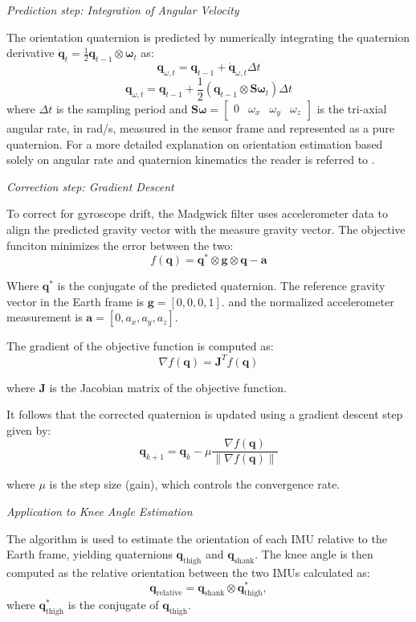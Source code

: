 \textit{Prediction step: Integration of Angular Velocity}

The orientation quaternion is predicted by numerically integrating the quaternion derivative 
\(
\dot{\mathbf{q}}_t = \frac{1}{2} \mathbf{q}_{t-1} \otimes \boldsymbol{\omega}_t
\) as:
\[
\mathbf{q}_{\omega, t} = \mathbf{q}_{t-1} + \dot{\mathbf{q}}_{\omega, t} \Delta t
\]
\[
\mathbf{q}_{\omega, t} = \mathbf{q}_{t-1} + \frac{1}{2} \left( \mathbf{q}_{t-1} \otimes \mathbf{S}\boldsymbol{\omega}_t \right) \Delta t
\]
where \( \Delta t \) is the sampling period and 
\(
\mathbf{S}\boldsymbol{\omega} = 
\begin{bmatrix}
0 & \omega_x & \omega_y & \omega_z
\end{bmatrix}
\)
is the tri-axial angular rate, in rad/s, measured in the sensor frame and represented as a pure quaternion. For a more detailed explanation on orientation estimation based solely on angular rate and quaternion kinematics the reader is referred to \cite{sola_quaternion_2017}.
\newline

\textit{Correction step: Gradient Descent}

To correct for gyroscope drift, the Madgwick filter uses accelerometer data to align the predicted gravity vector with the measure gravity vector. The objective funciton minimizes the error between the two:
\[
f(\mathbf{q}) = \mathbf{q}^* \otimes \mathbf{g} \otimes \mathbf{q} - \mathbf{a}
\]

Where  \( \mathbf{q}^* \) is the conjugate of the predicted quaternion. The reference gravity vector in the Earth frame is \(\mathbf{g} = [0, 0, 0, 1].\) and the normalized accelerometer measurement is
    \(
    \mathbf{a} = [0, a_x, a_y, a_z].
    \)

The gradient of the objective function is computed as:
\[
\nabla f(\mathbf{q}) = \mathbf{J}^T f(\mathbf{q})
\]

where \( \mathbf{J} \) is the Jacobian matrix of the objective function.

It follows that the corrected quaternion is updated using a gradient descent step given by:
\[
\mathbf{q}_{k+1} = \mathbf{q}_k - \mu \frac{\nabla f(\mathbf{q})}{\|\nabla f(\mathbf{q})\|}
\]

where \( \mu \) is the step size (gain), which controls the convergence rate.
\newline

\textit{Application to Knee Angle Estimation}

 The algorithm is used to estimate the orientation of each IMU relative to the Earth frame, yielding quaternions \( \mathbf{q}_{\text{thigh}} \) and \( \mathbf{q}_{\text{shank}} \). The knee angle is then computed as the relative orientation between the two IMUs calculated as:
\[
\mathbf{q}_{\text{relative}} = \mathbf{q}_{\text{shank}} \otimes \mathbf{q}_{\text{thigh}}^*,
\]
where \( \mathbf{q}_{\text{thigh}}^* \) is the conjugate of \( \mathbf{q}_{\text{thigh}} \).

